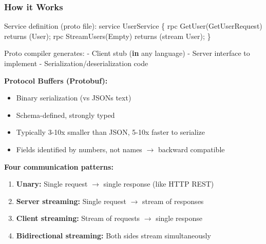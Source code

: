 \documentclass[11pt]{article}
\providecommand{\tightlist}{\setlength{\itemsep}{1pt}\setlength{\parskip}{0pt}}
\newenvironment{Shaded}{\begin{snugshade}}{\end{snugshade}}
\newcommand{\BuiltInTok}[1]{\textcolor[rgb]{0.50,0.55,0.55}{#1}}
\newcommand{\KeywordTok}[1]{\textcolor[rgb]{0.81,0.81,0.76}{\textbf{#1}}}
\newcommand{\NormalTok}[1]{\textcolor[rgb]{0.81,0.81,0.76}{#1}}
\newcommand{\OperatorTok}[1]{\textcolor[rgb]{0.81,0.81,0.76}{#1}}
\begin{document}
\subsubsection{How it Works}\label{how-it-works}


\begin{Shaded}
\begin{Highlighting}[]
\NormalTok{Service definition (proto }\BuiltInTok{file}\NormalTok{):}
\NormalTok{  service UserService \{}
\NormalTok{    rpc GetUser(GetUserRequest) returns (User)}\OperatorTok{;}
\NormalTok{    rpc StreamUsers(Empty) returns (stream User)}\OperatorTok{;}
\NormalTok{  \}}

\NormalTok{Proto compiler generates:}
  \OperatorTok{{-}}\NormalTok{ Client stub (}\KeywordTok{in} \BuiltInTok{any}\NormalTok{ language)}
  \OperatorTok{{-}}\NormalTok{ Server interface to implement}
  \OperatorTok{{-}}\NormalTok{ Serialization}\OperatorTok{/}\NormalTok{deserialization code}
\end{Highlighting}
\end{Shaded}

\textbf{Protocol Buffers (Protobuf):}

\begin{itemize}
\tightlist
\item
  Binary serialization (vs JSON\textquotesingle s text)
\item
  Schema-defined, strongly typed
\item
  Typically 3-10x smaller than JSON, 5-10x faster to serialize
\item
  Fields identified by numbers, not names \(\rightarrow\) backward compatible
\end{itemize}

\textbf{Four communication patterns:}

\begin{enumerate}
\def\labelenumi{\arabic{enumi}.}
\tightlist
\item
  \textbf{Unary:} Single request \(\rightarrow\) single response (like HTTP REST)
\item
  \textbf{Server streaming:} Single request \(\rightarrow\) stream of responses
\item
  \textbf{Client streaming:} Stream of requests \(\rightarrow\) single response
\item
  \textbf{Bidirectional streaming:} Both sides stream simultaneously
\end{enumerate}
\end{document}
